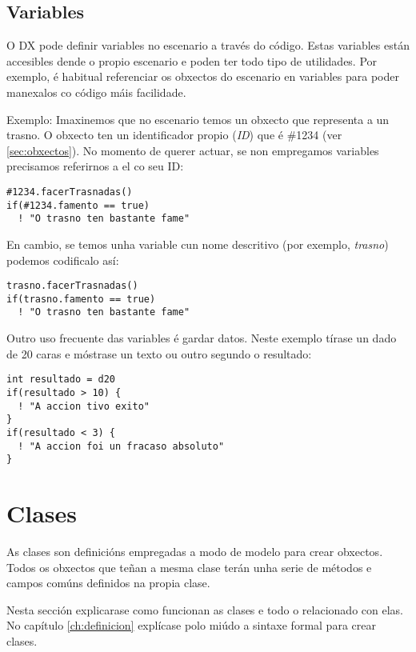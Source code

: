 \subsection{Variables}
O DX pode definir variables no escenario a través do código. Estas variables
están accesibles dende o propio escenario e poden ter todo tipo de utilidades.
Por exemplo, é habitual referenciar os obxectos do escenario en variables para
poder manexalos co código máis facilidade.
\par
Exemplo: Imaxinemos que no escenario temos un obxecto que representa a un
trasno. O obxecto ten un identificador propio ({\it ID}) que é \#1234 (ver
\ref{sec:obxectos}).
No momento de querer actuar, se non empregamos variables precisamos referirnos a
el co seu ID:
\begin{lstlisting}
#1234.facerTrasnadas()
if(#1234.famento == true)
  ! "O trasno ten bastante fame"
\end{lstlisting}
\par
En cambio, se temos unha variable cun nome descritivo (por exemplo, {\it
trasno}) podemos codificalo así:
\begin{lstlisting}
trasno.facerTrasnadas()
if(trasno.famento == true)
  ! "O trasno ten bastante fame"
\end{lstlisting}
\par
Outro uso frecuente das variables é gardar datos. Neste exemplo tírase un dado
de 20 caras e móstrase un texto ou outro segundo o resultado:
\begin{lstlisting}
int resultado = d20
if(resultado > 10) {
  ! "A accion tivo exito"
}
if(resultado < 3) {
  ! "A accion foi un fracaso absoluto"
}
\end{lstlisting}



\section{Clases}
\label{sec:clases}
As clases son definicións empregadas a modo de modelo para crear obxectos. Todos
os obxectos que teñan a mesma clase terán unha serie de métodos e campos
comúns definidos na propia clase.
\par
Nesta sección explicarase como funcionan as clases e todo o relacionado con
elas. No capítulo \ref{ch:definicion} explícase polo miúdo a sintaxe formal para
crear clases.
